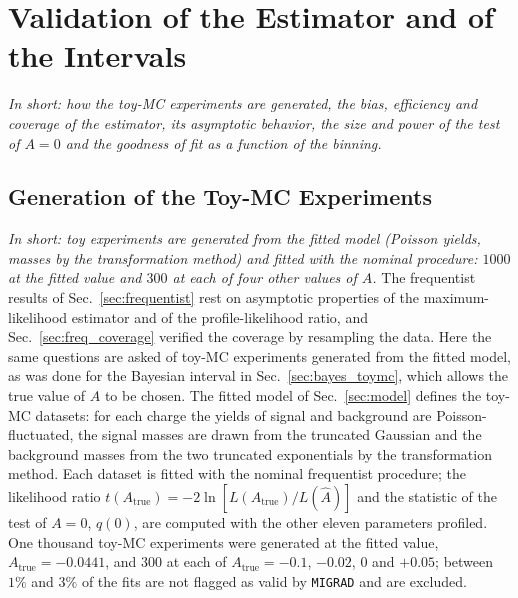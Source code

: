 \FloatBarrier

\section{Validation of the Estimator and of the Intervals}
\label{app:ext_valid}
\label{sec:appendix_checks}
\emph{In short: how the toy-MC experiments are generated, the bias, efficiency and coverage of the estimator, its asymptotic behavior, the size and power of the test of $A=0$ and the goodness of fit as a function of the binning.}

\subsection{Generation of the Toy-MC Experiments}
\emph{In short: toy experiments are generated from the fitted model (Poisson yields, masses by the transformation method) and fitted with the nominal procedure: $1000$ at the fitted value and $300$ at each of four other values of $A$.}
The frequentist results of Sec.~\ref{sec:frequentist} rest on asymptotic properties of the maximum-likelihood estimator and of the profile-likelihood ratio, and Sec.~\ref{sec:freq_coverage} verified the coverage by resampling the data. Here the same questions are asked of toy-MC experiments generated from the fitted model, as was done for the Bayesian interval in Sec.~\ref{sec:bayes_toymc}, which allows the true value of $A$ to be chosen. The fitted model of Sec.~\ref{sec:model} defines the toy-MC datasets: for each charge the yields of signal and background are Poisson-fluctuated, the signal masses are drawn from the truncated Gaussian and the background masses from the two truncated exponentials by the transformation method. Each dataset is fitted with the nominal frequentist procedure; the likelihood ratio $t(A_{\mathrm{true}})=-2\ln[L(A_{\mathrm{true}})/L(\hat A)]$ and the statistic of the test of $A=0$, $q(0)$, are computed with the other eleven parameters profiled. One thousand toy-MC experiments were generated at the fitted value, $A_{\mathrm{true}}=-0.0441$, and $300$ at each of $A_{\mathrm{true}}=-0.1$, $-0.02$, $0$ and $+0.05$; between $1\%$ and $3\%$ of the fits are not flagged as valid by \texttt{MIGRAD} and are excluded.

